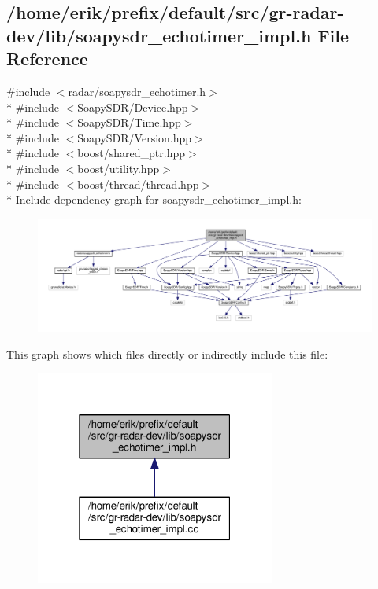 \subsection{/home/erik/prefix/default/src/gr-\/radar-\/dev/lib/soapysdr\+\_\+echotimer\+\_\+impl.h File Reference}
\label{soapysdr__echotimer__impl_8h}
{\ttfamily \#include $<$radar/soapysdr\+\_\+echotimer.\+h$>$}\\*
{\ttfamily \#include $<$Soapy\+S\+D\+R/\+Device.\+hpp$>$}\\*
{\ttfamily \#include $<$Soapy\+S\+D\+R/\+Time.\+hpp$>$}\\*
{\ttfamily \#include $<$Soapy\+S\+D\+R/\+Version.\+hpp$>$}\\*
{\ttfamily \#include $<$boost/shared\+\_\+ptr.\+hpp$>$}\\*
{\ttfamily \#include $<$boost/utility.\+hpp$>$}\\*
{\ttfamily \#include $<$boost/thread/thread.\+hpp$>$}\\*
Include dependency graph for soapysdr\+\_\+echotimer\+\_\+impl.\+h\+:
\nopagebreak
\begin{figure}[H]
\begin{center}
\leavevmode
\includegraphics[width=350pt]{db/d57/soapysdr__echotimer__impl_8h__incl}
\end{center}
\end{figure}
This graph shows which files directly or indirectly include this file\+:
\nopagebreak
\begin{figure}[H]
\begin{center}
\leavevmode
\includegraphics[width=223pt]{d0/d3b/soapysdr__echotimer__impl_8h__dep__incl}
\end{center}
\end{figure}
